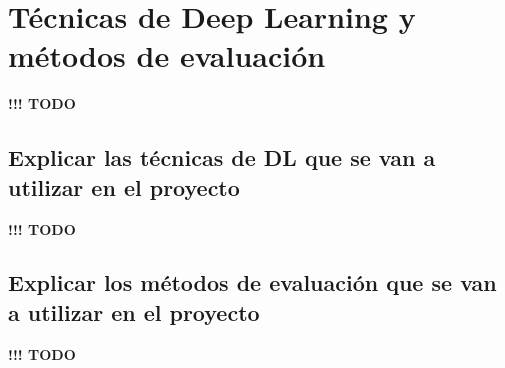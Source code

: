 \section{Técnicas de Deep Learning y métodos de evaluación}

\textbf{!!! TODO}

\subsection{Explicar las técnicas de DL que se van a utilizar en el proyecto}


\textbf{!!! TODO}

\subsection{Explicar los métodos de evaluación que se van a utilizar en el proyecto}


\textbf{!!! TODO}
